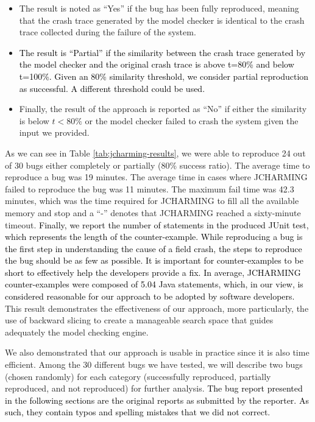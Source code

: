 \documentclass[times, doublespace]{smrauth}
\newcommand{\red}[1]{\textcolor{black}{#1}}
\begin{document}
{\begin{itemize}
  \item The result is noted as ``Yes'' if the bug has been fully
reproduced, meaning that the crash trace generated by the
model checker is identical to the crash trace collected
during the failure of the system.
\item \red{The result is ``Partial'' if the similarity between the crash
trace generated by the model checker and the original
crash trace is above t=80\% and below t=100\%. Given an 80\% similarity
threshold, we consider partial reproduction as successful.
A different threshold could be used.}
\item Finally, the result of the approach is reported as ``No'' if
either the similarity is below $t < 80\%$ or the model
checker failed to crash the system given the input we
provided.
\end{itemize}


As we can see in Table \ref{tab:jcharming-results}, we were able to reproduce 24  out of 30 bugs either completely or partially (80\% success ratio). The average time to reproduce a bug was 19 minutes. The average time in cases where JCHARMING failed to reproduce the bug  was 11 minutes. The maximum fail time was 42.3 minutes, which was the time
required for JCHARMING to fill all the available memory and stop and a ``-'' denotes that JCHARMING reached a sixty-minute timeout.
\red{Finally, we report the number of statements in the produced JUnit test, which represents the length of the counter-example.
While reproducing a bug is the first step in understanding the cause of a field crash, the steps to reproduce the bug should be as few as possible.
It is important for counter-examples to be short to effectively help the developers provide a fix.
In average, JCHARMING counter-examples were composed of 5.04 Java statements, which, in our view, is considered reasonable for our approach to be adopted by software developers.
}
This result demonstrates the effectiveness of our approach,
more particularly, the use of backward slicing to create a
manageable search space that guides adequately the model
checking engine.} We also demonstrated that our approach is usable
in practice since it is also time efficient. Among the 30 different bugs we have tested, we will describe
two bugs (chosen randomly) for each category (successfully
reproduced, partially reproduced, and not reproduced) for
further analysis.
\red{The bug report presented in the following sections are the original reports as submitted by the reporter.
As such, they contain typos and spelling mistakes that we did not correct.}
\end{document}
